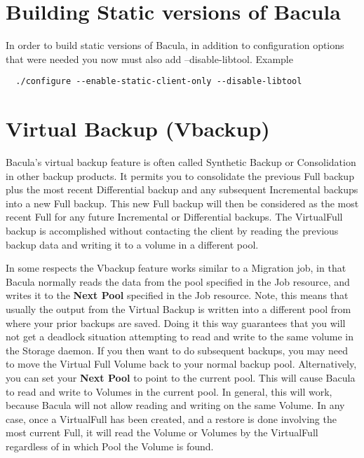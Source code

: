 \section{Building Static versions of Bacula}
In order to build static versions of Bacula, in addition
to configuration options that were needed you now must
also add --disable-libtool.  Example

\begin{verbatim}
  ./configure --enable-static-client-only --disable-libtool
\end{verbatim}


\section{Virtual Backup (Vbackup)}

Bacula's virtual backup feature is often called Synthetic Backup or
Consolidation in other backup products.  It permits you to consolidate the
previous Full backup plus the most recent Differential backup and any
subsequent Incremental backups into a new Full backup.  This new Full
backup will then be considered as the most recent Full for any future
Incremental or Differential backups.  The VirtualFull backup is
accomplished without contacting the client by reading the previous backup
data and writing it to a volume in a different pool.

In some respects the Vbackup feature works similar to a Migration job, in
that Bacula normally reads the data from the pool specified in the 
Job resource, and writes it to the {\bf Next Pool} specified in the 
Job resource. Note, this means that usually the output from the Virtual
Backup is written into a different pool from where your prior backups
are saved. Doing it this way guarantees that you will not get a deadlock
situation attempting to read and write to the same volume in the Storage
daemon. If you then want to do subsequent backups, you may need to
move the Virtual Full Volume back to your normal backup pool.
Alternatively, you can set your {\bf Next Pool} to point to the current
pool.  This will cause Bacula to read and write to Volumes in the
current pool. In general, this will work, because Bacula will
not allow reading and writing on the same Volume. In any case, once
a VirtualFull has been created, and a restore is done involving the
most current Full, it will read the Volume or Volumes by the VirtualFull 
regardless of in which Pool the Volume is found.

